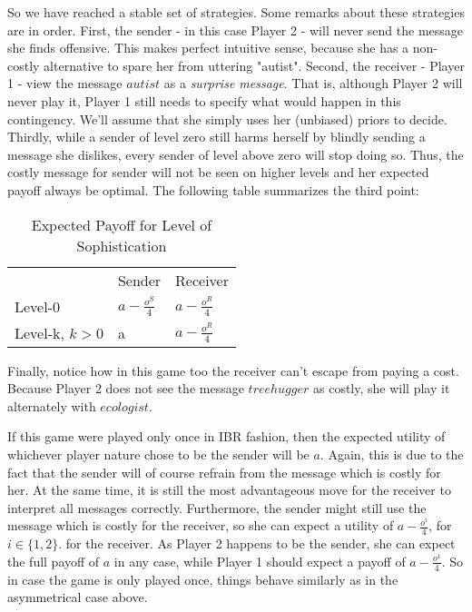 \documentclass{article}
\begin{document}
So we have reached a stable set of strategies. Some remarks about these strategies are in order. First, the sender - in this case Player 2 - will never send the message she finds offensive. This makes perfect intuitive sense, because she has a non-costly alternative to spare her from uttering "autist". Second, the receiver - Player 1 - view the message $autist$ as a \textit{surprise message}. That is, although Player 2 will never play it, Player 1 still needs to specify what would happen in this contingency. We'll assume that she simply uses her (unbiased) priors to decide.
Thirdly, while a sender of level zero still harms herself by blindly sending a message she dislikes, every sender of level above zero will stop doing so. Thus, the costly message for sender will not be seen on higher levels and her expected payoff  always be optimal.
The following table summarizes the third point:
\begin{table}[h]
\centering
\caption{Expected Payoff for Level of Sophistication}
\label{my-label}
\begin{tabular}{lll}
                                    & Sender                                  & Receiver                                \\ \cline{2-3} 
\multicolumn{1}{l|}{Level-0}        & \multicolumn{1}{l|}{$a-\tfrac{o^S}{4}$} & \multicolumn{1}{l|}{$a-\tfrac{o^R}{4}$} \\ \cline{2-3} 
\multicolumn{1}{l|}{Level-k, $k>0$} & \multicolumn{1}{l|}{a}                  & \multicolumn{1}{l|}{$a-\tfrac{o^R}{4}$} \\ \cline{2-3} 
\end{tabular}
\end{table}

Finally, notice how in this game too the receiver can't escape from paying a cost. Because Player 2 does not see the message $treehugger$ as costly, she will play it alternately with $ecologist$.

If this game were played only once in IBR fashion, then the expected utility of whichever player nature chose to be the sender will be $a$. Again, this is due to the fact that the sender will of course refrain from the message which is costly for her. At the same time, it is still the most advantageous move for the receiver to interpret all messages correctly. Furthermore, the sender might still use the message which is costly for the receiver, so she can expect a utility of $a-\tfrac{o^i}{4}$, for $i\in \{1,2\}$. for the receiver. As Player 2 happens to be the sender, she can expect the full payoff of $a$ in any case, while Player 1 should expect a payoff of $a-\tfrac{o^1}{4}$. So in case the game is only played once, things behave similarly as in the asymmetrical case above.
\end{document}
